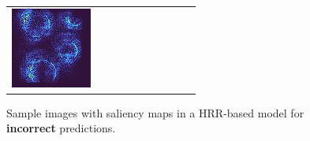 \documentclass[letterpaper]{article} %
\begin{document}
\begin{figure}[!htbp]
\begin{tabular}{cccccccccc}
\multicolumn{1}{c}{\includegraphics[width=0.07\columnwidth]{figures/appendix/hrr/false/89_slc.jpg}} \hspace{-11pt}
\end{tabular}
\caption{Sample images with saliency maps in a HRR-based model for \textbf{incorrect} predictions.}
\label{fig:hrr_false}
\end{figure}
\end{document}
